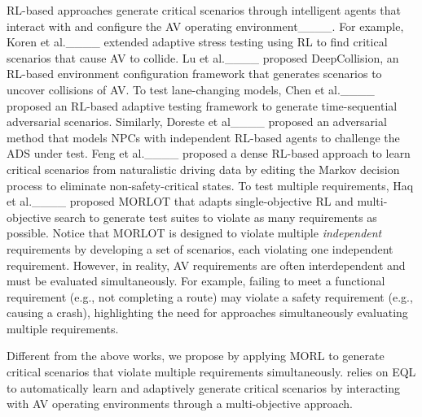 RL-based approaches generate critical scenarios through intelligent agents that interact with and configure the AV operating environment____. For example, 
Koren et al.____ extended adaptive stress testing using RL to find critical scenarios that cause AV to collide.
Lu et al.____ proposed DeepCollision, an RL-based environment configuration framework that generates scenarios to uncover collisions of AV. To test lane-changing models, Chen et al.____ proposed an RL-based adaptive testing framework to generate time-sequential adversarial scenarios. Similarly, Doreste et al____ proposed an adversarial method that models NPCs with independent RL-based agents to challenge the ADS under test. Feng et al.____ proposed a dense RL-based approach to learn critical scenarios from naturalistic driving data by editing the Markov decision process to eliminate non-safety-critical states. 
To test multiple requirements, Haq et al.____ proposed MORLOT that adapts single-objective RL and multi-objective search to generate test suites to violate as many requirements as possible. Notice that MORLOT is designed to violate multiple \textit{independent} requirements by developing a set of scenarios, each violating one independent requirement. However, in reality, AV requirements are often interdependent and must be evaluated simultaneously.
For example, failing to meet a functional requirement (e.g., not completing a route) may violate a safety requirement (e.g., causing a crash), highlighting the need for approaches simultaneously evaluating multiple requirements. 

Different from the above works, we propose \method by applying MORL to generate critical scenarios that violate multiple requirements simultaneously. \method relies on EQL to automatically learn and adaptively generate critical scenarios by interacting with AV operating environments through a multi-objective approach.